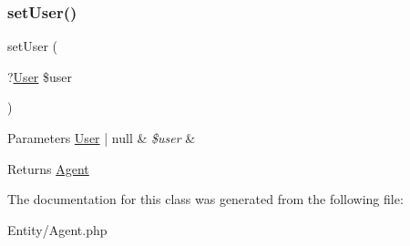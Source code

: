 \subsubsection{\texorpdfstring{setUser()}{setUser()}}
{\footnotesize\ttfamily set\+User (\begin{DoxyParamCaption}\item[{?\mbox{\hyperlink{class_app_1_1_entity_1_1_user}{User}}}]{\$user }\end{DoxyParamCaption})}


\begin{DoxyParams}[1]{Parameters}
\mbox{\hyperlink{class_app_1_1_entity_1_1_user}{User}} | null & {\em \$user} & \\
\hline
\end{DoxyParams}
\begin{DoxyReturn}{Returns}
\mbox{\hyperlink{class_app_1_1_entity_1_1_agent}{Agent}} 
\end{DoxyReturn}


The documentation for this class was generated from the following file\+:\begin{DoxyCompactItemize}
\item 
Entity/Agent.\+php\end{DoxyCompactItemize}
